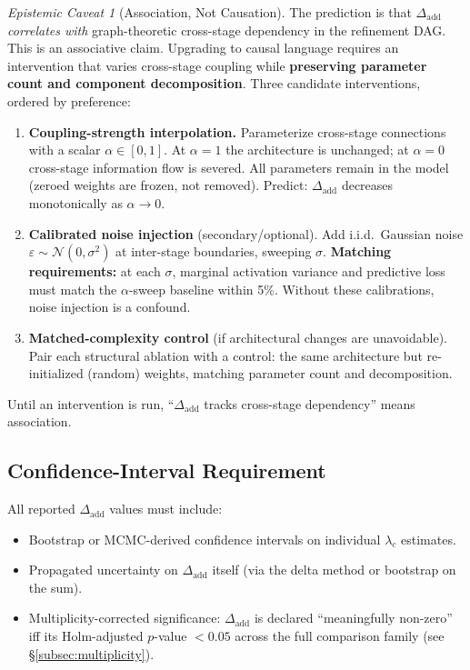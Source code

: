 \documentclass[11pt,a4paper]{article}
\theoremstyle{definition}
\theoremstyle{remark}
\newtheorem{caveat}[theorem]{Epistemic Caveat}
\newcommand{\LLC}{\lambda}
\newcommand{\Dadd}{\Delta_{\mathrm{add}}}
\begin{document}
\begin{caveat}[Association, Not Causation]\label{cav:assoc}
  The prediction is that $\Dadd$ \emph{correlates with} graph-theoretic
  cross-stage dependency in the refinement DAG.  This is an associative claim.
  Upgrading to causal language requires an intervention that varies cross-stage
  coupling while \textbf{preserving parameter count and component
  decomposition}.  Three candidate interventions, ordered by preference:
  \begin{enumerate}[label=(\alph*)]
    \item \textbf{Coupling-strength interpolation.}  Parameterize cross-stage
      connections with a scalar $\alpha \in [0,1]$.  At $\alpha=1$ the
      architecture is unchanged; at $\alpha=0$ cross-stage information flow is
      severed.  All parameters remain in the model (zeroed weights are frozen,
      not removed).  Predict: $\Dadd$ decreases monotonically as
      $\alpha \to 0$.
    \item \textbf{Calibrated noise injection} (secondary/optional).  Add
      i.i.d.\ Gaussian noise $\varepsilon \sim \mathcal{N}(0, \sigma^2)$ at
      inter-stage boundaries, sweeping $\sigma$.  \textbf{Matching
      requirements:} at each $\sigma$, marginal activation variance and
      predictive loss must match the $\alpha$-sweep baseline within 5\%.
      Without these calibrations, noise injection is a confound.
    \item \textbf{Matched-complexity control} (if architectural changes are
      unavoidable).  Pair each structural ablation with a control: the same
      architecture but re-initialized (random) weights, matching parameter
      count and decomposition.
  \end{enumerate}
  Until an intervention is run, ``$\Dadd$ tracks cross-stage dependency'' means
  association.
\end{caveat}

\subsection{Confidence-Interval Requirement}

All reported $\Dadd$ values must include:
\begin{itemize}
  \item Bootstrap or MCMC-derived confidence intervals on individual
    $\LLC_c$ estimates.
  \item Propagated uncertainty on $\Dadd$ itself (via the delta method or
    bootstrap on the sum).
  \item Multiplicity-corrected significance: $\Dadd$ is declared ``meaningfully
    non-zero'' iff its Holm-adjusted $p$-value $< 0.05$ across the full
    comparison family (see \S\ref{subsec:multiplicity}).
\end{itemize}
\end{document}
